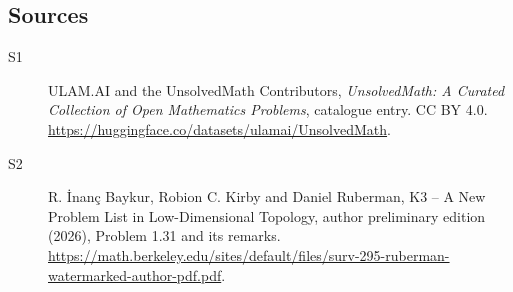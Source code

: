\documentclass[11pt]{article}
\begin{document}
\subsection{Sources}
\begin{description}
\item[\hypertarget{source:statement:1}{S1}] ULAM.AI and the UnsolvedMath Contributors, \emph{UnsolvedMath: A Curated Collection of Open Mathematics Problems}, catalogue entry. CC BY 4.0. \url{https://huggingface.co/datasets/ulamai/UnsolvedMath}.
\item[\hypertarget{source:statement:2}{S2}] R. \.{I}nan\c{c} Baykur, Robion C. Kirby and Daniel Ruberman, K3 -- A New Problem List in Low-Dimensional Topology, author preliminary edition (2026), Problem 1.31 and its remarks. \url{https://math.berkeley.edu/sites/default/files/surv-295-ruberman-watermarked-author-pdf.pdf}.
\end{description}
\label{end:statement}
\end{document}
